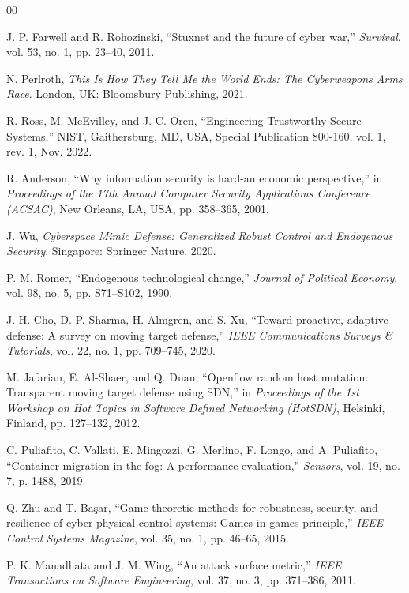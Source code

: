 ﻿\documentclass[lettersize,journal]{IEEEtran}
\begin{document}
\begin{thebibliography}{00}

J. P. Farwell and R. Rohozinski, “Stuxnet and the future of cyber war,” \textit{Survival}, vol. 53, no. 1, pp. 23–40, 2011.

N. Perlroth, \textit{This Is How They Tell Me the World Ends: The Cyberweapons Arms Race}. London, UK: Bloomsbury Publishing, 2021.

R. Ross, M. McEvilley, and J. C. Oren, “Engineering Trustworthy Secure Systems,” NIST, Gaithersburg, MD, USA, Special Publication 800-160, vol. 1, rev. 1, Nov. 2022.

R. Anderson, “Why information security is hard-an economic perspective,” in \textit{Proceedings of the 17th Annual Computer Security Applications Conference (ACSAC)}, New Orleans, LA, USA, pp. 358–365, 2001.

J. Wu, \textit{Cyberspace Mimic Defense: Generalized Robust Control and Endogenous Security}. Singapore: Springer Nature, 2020.

P. M. Romer, “Endogenous technological change,” \textit{Journal of Political Economy}, vol. 98, no. 5, pp. S71–S102, 1990.

J. H. Cho, D. P. Sharma, H. Almgren, and S. Xu, “Toward proactive, adaptive defense: A survey on moving target defense,” \textit{IEEE Communications Surveys \& Tutorials}, vol. 22, no. 1, pp. 709–745, 2020.

M. Jafarian, E. Al-Shaer, and Q. Duan, “Openflow random host mutation: Transparent moving target defense using SDN,” in \textit{Proceedings of the 1st Workshop on Hot Topics in Software Defined Networking (HotSDN)}, Helsinki, Finland, pp. 127–132, 2012.

C. Puliafito, C. Vallati, E. Mingozzi, G. Merlino, F. Longo, and A. Puliafito, “Container migration in the fog: A performance evaluation,” \textit{Sensors}, vol. 19, no. 7, p. 1488, 2019.

Q. Zhu and T. Ba\c{s}ar, “Game-theoretic methods for robustness, security, and resilience of cyber-physical control systems: Games-in-games principle,” \textit{IEEE Control Systems Magazine}, vol. 35, no. 1, pp. 46–65, 2015.

P. K. Manadhata and J. M. Wing, “An attack surface metric,” \textit{IEEE Transactions on Software Engineering}, vol. 37, no. 3, pp. 371–386, 2011.


\end{thebibliography}
\end{document}
